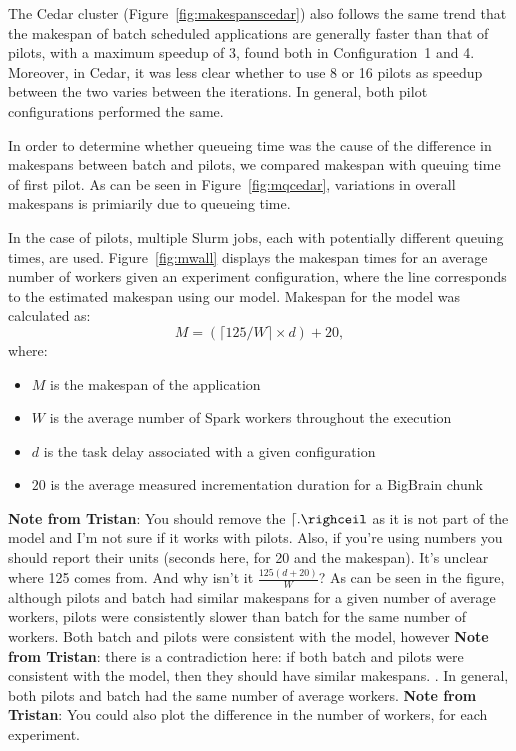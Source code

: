 \documentclass{IEEEtran}
\newcommand{\tristan}[1]{\color{red}\textbf{Note from Tristan}:
      #1 \color{black}}
\newcommand{\TG}[1]{\tristan{#1}}
\begin{document}
The Cedar cluster (Figure~\ref{fig:makespanscedar}) also follows the same trend that
the makespan of batch scheduled applications are generally faster than that of pilots,
with a maximum speedup of 3, found both in Configuration~1 and 4. Moreover, in 
Cedar, it was less clear whether to use 8 or 16 pilots as speedup between the two
varies between the iterations. In general, both pilot configurations performed the
same.

In order to determine whether queueing time was the cause of the difference 
in makespans between batch and pilots, we compared makespan with queuing time of 
first pilot. As can be seen in Figure~\ref{fig:mqcedar}, variations in overall
makespans is primiarily due to queueing time.

In the case of pilots, multiple Slurm jobs, each with potentially different queuing times,
are used. Figure~\ref{fig:mwall} displays the makespan times for an average number of workers
given an experiment configuration, where the line corresponds to the estimated makespan using 
our model. Makespan for the model was calculated as:
$$
M = (\lceil 125/W \rceil\times d) + 20,
$$
where:
\begin{itemize}
    \item $M$ is the makespan of the application
    \item $W$ is the average number of Spark workers throughout the execution
    \item $d$ is the task delay associated with a given configuration
    \item $20$ is the average measured incrementation duration for a BigBrain chunk
\end{itemize}
\TG{You should remove the $\lceil . \righceil$ as it is not part of the model and I'm not sure
if it works with pilots. Also, if you're using numbers you should report their units (seconds here, for 20 and the makespan).
It's unclear where 125 comes from. And why isn't it $\frac{125(d+20)}{W}$?}
As can be seen in the figure, although pilots and batch had similar makespans
for a given number of average workers, pilots were consistently slower than batch
for the same number of workers. Both batch and pilots were consistent with the 
model, however \TG{there is a contradiction here: if both batch and pilots were consistent with the model, then
they should have similar makespans.}. In general, both pilots and batch had the same number of average
workers. \TG{You could also plot the difference in the number of workers, for each experiment.}
\end{document}
